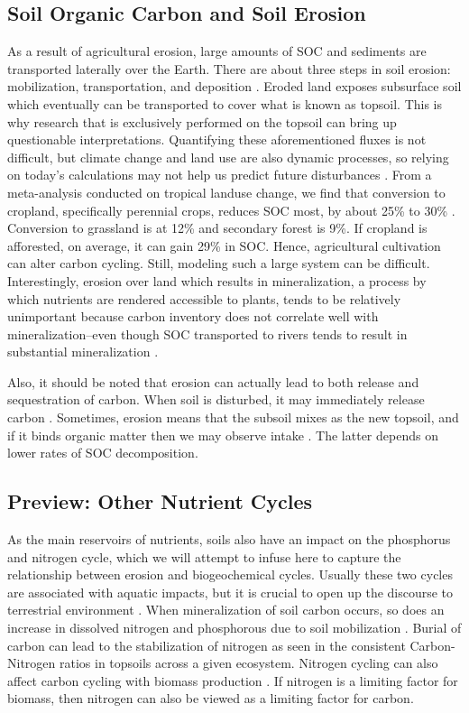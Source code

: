 \subsection{Soil Organic Carbon and Soil Erosion}
As a result of agricultural erosion, large amounts of SOC and sediments are transported laterally over the Earth. There are about three steps in soil erosion: mobilization, transportation, and deposition \citep{quinton2010impact}. Eroded land exposes subsurface soil which eventually can be transported to cover what is known as topsoil. This is why research that is exclusively performed on the topsoil can bring up questionable interpretations. 
Quantifying these aforementioned fluxes is not difficult, but climate change and land use are also dynamic processes, so relying on today's calculations may not help us predict future disturbances \citep{heimann2008terrestrial}.
From a meta-analysis conducted on tropical landuse change, we find that conversion to cropland, specifically perennial crops, reduces SOC most, by about 25\% to 30\% \citep{don2011impact}. Conversion to grassland is at 12\% and secondary forest is 9\%. If cropland is afforested, on average, it can gain 29\% in SOC. Hence, agricultural cultivation can alter carbon cycling. Still, modeling such a large system can be difficult.
Interestingly, erosion over land which results in mineralization, a process by which nutrients are rendered accessible to plants, tends to be relatively unimportant because carbon inventory does not correlate well with mineralization--even though SOC transported to rivers tends to result in substantial mineralization \citep{cole2007plumbing}. 

Also, it should be noted that erosion can actually lead to both release and sequestration of carbon. When soil is disturbed, it may immediately release carbon \citep{berhe2007significance}. Sometimes, erosion means that the subsoil mixes as the new topsoil, and if it binds organic matter then we may observe intake \citep{harden1999dynamic}. The latter depends on lower rates of SOC decomposition.

\subsection{Preview: Other Nutrient Cycles}
As the main reservoirs of nutrients, soils also have an impact on the phosphorus and nitrogen cycle, which we will attempt to infuse here to capture the relationship between erosion and biogeochemical cycles. Usually these two cycles are associated with aquatic impacts, but it is crucial to open up the discourse to terrestrial environment \citep{van2007impact}. When mineralization of soil carbon occurs, so does an increase in dissolved nitrogen and phosphorous due to soil mobilization \citep{jacinthe2002carbon}. Burial of carbon can lead to the stabilization of nitrogen as seen in the consistent Carbon-Nitrogen ratios in topsoils across a given ecosystem. Nitrogen cycling can also affect carbon cycling with biomass production \citep{van2006element}. If nitrogen is a limiting factor for biomass, then nitrogen can also be viewed as a limiting factor for carbon.






